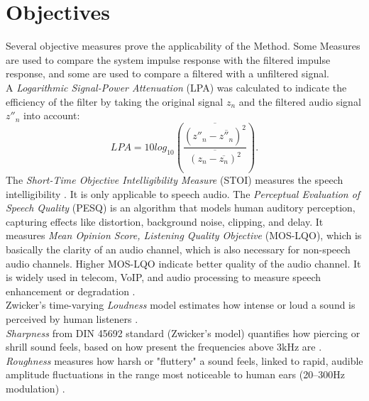 \documentclass{article}
\begin{document}
\section{Objectives}
Several objective measures prove the applicability of the Method.
Some Measures are used to compare the system impulse response with the filtered impulse response, and some are used to compare a filtered with a unfiltered signal. \\

A \textit{Logarithmic Signal-Power Attenuation} (LPA) was calculated to indicate the efficiency of the filter by taking the original signal $z_n$ and the filtered audio signal $z''_n$ into account:
	\begin{equation}
	LPA=10log_{10} \left(\frac{\overline{(z''_n-\overline{z''_n})^2}}{\overline{(z_n-\overline{z_n})^2}}\right).
	\end{equation}
The \textit{Short-Time Objective Intelligibility Measure} (STOI) measures the speech intelligibility \cite{stoi2010}. It is only applicable to speech audio.
The \textit{Perceptual Evaluation of Speech Quality} (PESQ) is an algorithm that models human auditory perception, capturing effects like distortion, background noise, clipping, and delay. It measures \textit{Mean Opinion Score, Listening Quality Objective} (MOS-LQO), which is basically the clarity of an audio channel, which is also necessary for non-speech audio channels. Higher MOS-LQO indicate better quality of the audio channel.
It is widely used in telecom, VoIP, and audio processing to measure speech enhancement or degradation \cite{pesq2001}. \\

Zwicker’s time-varying \textit{Loudness} model estimates how intense or loud a sound is perceived by human listeners \cite{ISO5322}. \\

\textit{Sharpness} from DIN 45692 standard (Zwicker’s model) quantifies how piercing or shrill sound feels, based on how present the frequencies above 3kHz are \cite{DIN45692Free}. \\

\textit{Roughness} measures how harsh or "fluttery" a sound feels, linked to rapid, audible amplitude fluctuations in the range most noticeable to human ears (20–300Hz modulation) \cite{Fastl2006}. \\
\end{document}
